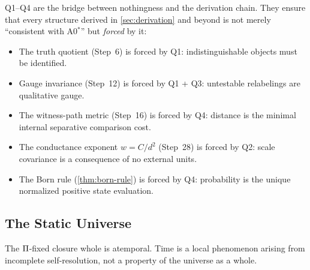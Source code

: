 \begin{remark}
\label{rem:forcing-bridge}
Q1--Q4 are the bridge between nothingness and the derivation chain.  They
ensure that every structure derived in \cref{sec:derivation} and beyond is
not merely ``consistent with A0$^*$'' but \emph{forced} by it:
\begin{itemize}[nosep]
  \item The truth quotient (Step~6) is forced by Q1: indistinguishable
        objects must be identified.
  \item Gauge invariance (Step~12) is forced by Q1 + Q3: untestable
        relabelings are qualitative gauge.
  \item The witness-path metric (Step~16) is forced by Q4: distance is
        the minimal internal separative comparison cost.
  \item The conductance exponent $w = C/d^2$ (Step~28) is forced by Q2:
        scale covariance is a consequence of no external units.
  \item The Born rule (\cref{thm:born-rule}) is forced by Q4: probability
        is the unique normalized positive state evaluation.
\end{itemize}
\end{remark}

\subsection{The Static Universe}
\label{sec:forcing:static}

The $\Pi$-fixed closure whole is atemporal.  Time is a local phenomenon
arising from incomplete self-resolution, not a property of the universe
as a whole.

